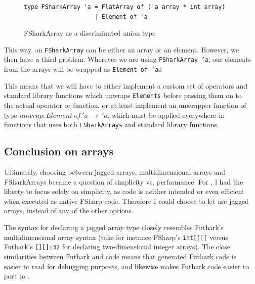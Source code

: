 \begin{figure}[H]
  \centering
\begin{verbatim}
type FSharkArray 'a = FlatArray of ('a array * int array)
                    | Element of 'a
\end{verbatim}
  \caption{FSharkArray as a discriminated union type}
  \label{fig:fsharkarrays1}
\end{figure}
This way, an \texttt{FSharkArray} can be either an array or an element. However,
we then have a third problem.
Wherever we are using \texttt{FSharkArray 'a}, our elements from the arrays will be wrapped as
\texttt{Element of 'a}s.

This means that we will have to either implement a custom set of \fsharp{}
operators and standard library functions which unwraps \texttt{Elements} before
passing them on to the actual operator or function, or at least implement an
unwrapper function of type $unwrap : Element~of~'a~\to~'a$, which must be applied
everywhere in functions that uses both \texttt{FSharkArrays} and \fsharp{}
standard library functions.

\subsection{Conclusion on arrays}
Ultimately, choosing between jagged arrays, multidimensional arrays and
FSharkArrays became a question of simplicity vs. performance.
For \fshark{}, I had the liberty to focus solely on simplicity, as \fshark{}
code is neither intended or even efficient when executed as native FSharp code.
Therefore I could choose to let \fshark{} use jagged arrays, instead of any of
the other options.

The syntax for declaring a jagged array type closely
resembles Futhark's multidimensional array syntax (take for instance FSharp's
\texttt{int[][]} versus Futhark's \texttt{[][]i32} for declaring
two-dimensional integer arrays).
The close similarities between Futhark and \fshark{} code means that \fshark{}
generated Futhark code is easier to read for debugging purposes, and likewise
makes Futhark code easier to port to \fshark{}.

